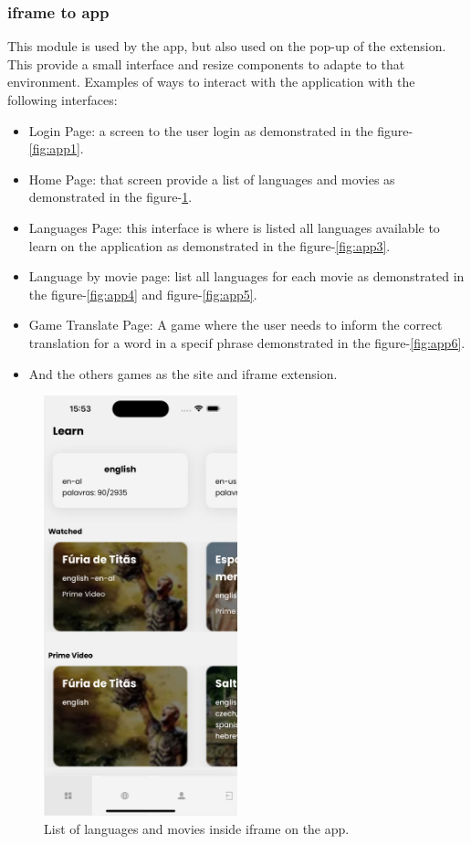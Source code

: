 \documentclass[12pt]{article}
\begin{document}
\subsubsection{iframe to app}
This module is used by the app, but also used on the pop-up of the extension. This provide a small interface and resize components to adapte to that environment. Examples of ways to interact with the application with the following interfaces:
\begin{itemize}
  \item Login Page: a screen to the user login as demonstrated in the figure-\ref{fig:app1}.
  \item Home Page:  that screen provide a list of languages and movies as demonstrated in the figure-\ref{fig:app2}.
  \item Languages Page: this interface is where is listed all languages available to learn on the application as demonstrated in the figure-\ref{fig:app3}.
  \item Language by movie page: list all languages for each movie as demonstrated in the figure-\ref{fig:app4} and figure-\ref{fig:app5}.
  \item Game Translate Page: A game where the user needs to inform the correct translation for a word in a specif phrase demonstrated in the figure-\ref{fig:app6}.
  \item And the others games as the site and iframe extension. 
  \end{itemize}
  
 \begin{figure}[!h]
    \centering
    \caption{
     List of languages and movies inside iframe on the app.
    }
    \label{fig:app2}
    \includegraphics[width=0.5\textwidth]{assets/15.png}
  \end{figure}
  
\end{document}
